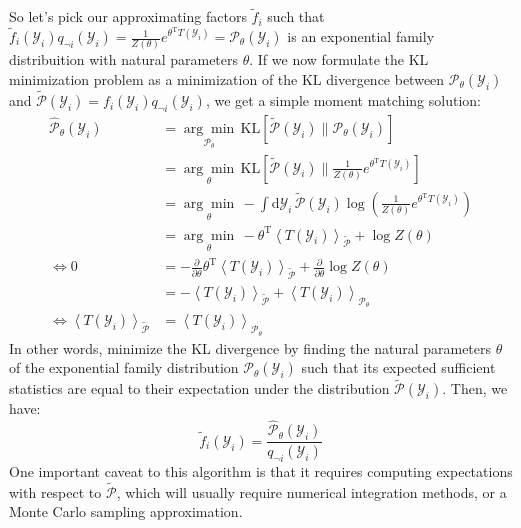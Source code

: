 \documentclass[a4paper]{article}
\begin{document}
So let's pick our approximating factors $\tilde{f}_i$ such that $\tilde{f}_i(\mathcal{Y}_i)q_{\neg i}(\mathcal{Y}_i) = \frac{1}{Z(\theta)}e^{\theta^\textrm{T}T(\mathcal{Y}_i)} = \mathcal{P}_\theta(\mathcal{Y}_i)$ is an exponential family distribuition with natural parameters $\theta$. If we now formulate the KL minimization problem as a minimization of the KL divergence between $\mathcal{P}_\theta(\mathcal{Y}_i)$ and $\tilde{\mathcal{P}}(\mathcal{Y}_i) = f_i(\mathcal{Y}_i)q_{\neg i}(\mathcal{Y}_i)$, we get a simple moment matching solution:
\begin{align*}
\hat{\mathcal{P}}_\theta(\mathcal{Y}_i) &= \underset{\mathcal{P}_\theta}{\arg\min}\, \textrm{KL}\left[\tilde{\mathcal{P}}(\mathcal{Y}_i) \| \mathcal{P}_\theta(\mathcal{Y}_i) \right] \\
&= \underset{\theta}{\arg\min}\, \textrm{KL}\left[\tilde{\mathcal{P}}(\mathcal{Y}_i) \| \frac{1}{Z(\theta)}e^{\theta^\textrm{T}T(\mathcal{Y}_i)} \right] \\
&= \underset{\theta}{\arg\min}\, -\int \textrm{d}\mathcal{Y}_i\, \tilde{\mathcal{P}}(\mathcal{Y}_i) \log\left(\frac{1}{Z(\theta)}e^{\theta^\textrm{T}T(\mathcal{Y}_i)}\right) \\
&= \underset{\theta}{\arg\min}\, -\theta^\textrm{T} \left\langle T(\mathcal{Y}_i) \right\rangle_{\tilde{\mathcal{P}}} + \log Z(\theta) \\
\Leftrightarrow 0 &= -\frac{\partial}{\partial \theta} \theta^\textrm{T} \left\langle T(\mathcal{Y}_i) \right\rangle_{\tilde{\mathcal{P}}} + \frac{\partial}{\partial \theta}\log Z(\theta) \\
&= -\left\langle T(\mathcal{Y}_i) \right\rangle_{\tilde{\mathcal{P}}} + \left\langle T(\mathcal{Y}_i) \right\rangle_{\mathcal{P}_\theta} \\
\Leftrightarrow \left\langle T(\mathcal{Y}_i) \right\rangle_{\tilde{\mathcal{P}}} &= \left\langle T(\mathcal{Y}_i) \right\rangle_{\mathcal{P}_\theta}
\end{align*}
In other words, minimize the KL divergence by finding the natural parameters $\theta$ of the exponential family distribution $\mathcal{P}_\theta(\mathcal{Y}_i)$ such that its expected sufficient statistics are equal to their expectation under the distribution $\tilde{\mathcal{P}}(\mathcal{Y}_i)$. Then, we have:
\[ \tilde{f}_i(\mathcal{Y}_i) = \frac{\hat{\mathcal{P}}_\theta(\mathcal{Y}_i)}{q_{\neg i}(\mathcal{Y}_i)} \]
One important caveat to this algorithm is that it requires computing expectations with respect to $\tilde{\mathcal{P}}$, which will usually require numerical integration methods, or a Monte Carlo sampling approximation.
\end{document}
